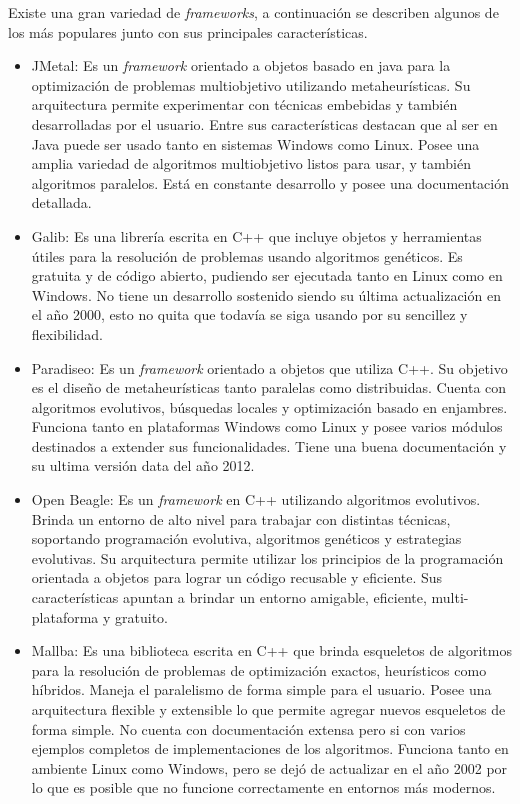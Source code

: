 Existe una gran variedad de \emph{frameworks}, a continuación se describen algunos de los más populares junto con sus principales características.

\begin{itemize}
	\item JMetal: Es un \emph{framework} orientado a objetos basado en java para la optimización de problemas multiobjetivo utilizando metaheurísticas. Su arquitectura permite experimentar con técnicas embebidas y también desarrolladas por el usuario. Entre sus características destacan que al ser en Java puede ser usado tanto en sistemas Windows como Linux. Posee una amplia variedad de algoritmos multiobjetivo listos para usar, y también algoritmos paralelos. Está en constante desarrollo y posee una documentación detallada. \citep{Jmetal}
	
	\item Galib: Es una librería escrita en C++ que incluye objetos y herramientas útiles para la resolución de problemas usando algoritmos genéticos. Es gratuita y de código abierto, pudiendo ser ejecutada tanto en Linux como en Windows. No tiene un desarrollo sostenido siendo su última actualización en el año 2000, esto no quita que todavía se siga usando por su sencillez y flexibilidad. \citep{Galib}
	
	\item Paradiseo: Es un \emph{framework} orientado a objetos que utiliza C++. Su objetivo es el diseño de metaheurísticas tanto paralelas como distribuidas. Cuenta con algoritmos evolutivos, búsquedas locales y optimización basado en enjambres. Funciona tanto en plataformas Windows como Linux y posee varios módulos destinados a extender sus funcionalidades. Tiene una buena documentación y su ultima versión data del año 2012. \citet{Paradiseo}
	
	\item Open Beagle: Es un \emph{framework} en C++ utilizando algoritmos evolutivos. Brinda un entorno de alto nivel para trabajar con distintas técnicas, soportando programación evolutiva, algoritmos genéticos y estrategias evolutivas. Su arquitectura permite utilizar los principios de la programación orientada a objetos para lograr un código recusable y eficiente. Sus características apuntan a brindar un entorno amigable, eficiente, multi-plataforma y gratuito. \citep{OpenBeagle}
	
	\item Mallba: Es una biblioteca escrita en C++ que brinda esqueletos de algoritmos para la resolución de problemas de optimización exactos, heurísticos como híbridos. Maneja el paralelismo de forma simple para el usuario. Posee una arquitectura flexible y extensible lo que permite agregar nuevos esqueletos de forma simple. No cuenta con documentación extensa pero si con varios ejemplos completos de implementaciones de los algoritmos. Funciona tanto en ambiente Linux como Windows, pero se dejó de actualizar en el año 2002 por lo que es posible que no funcione correctamente en entornos más modernos. \citep{Mallba}
	

\end{itemize}
